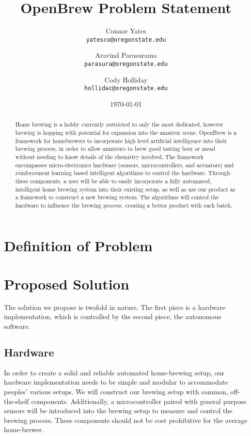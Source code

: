 \documentclass[letterpaper,10pt]{article}
\author{Connor Yates\\
\texttt{yatesco@oregonstate.edu}
\and
Aravind Parasurama\\
\texttt{parasura@oregonstate.edu}
\and
Cody Holliday\\
\texttt{hollidac@oregonstate.edu}}
\date{\today}
\title{OpenBrew Problem Statement}
\begin{document}
\maketitle

\begin{abstract}
Home brewing is a hobby currently restricted to only the most dedicated, however 
brewing is hopping with potential for expansion into the amateur scene. OpenBrew 
is a framework for homebrewers to incorporate high level artificial intelligence 
into their brewing process, in order to allow amateurs to brew good tasting beer 
or mead without needing to know details of the chemistry involved. The framework 
encompasses micro-electronics hardware (sensors, microcontrollers, and actuators) 
and reinforcement learning based intelligent algorithms to control the hardware. 
Through these components, a user will be able to easily incorporate a fully automated, 
intelligent home brewing system into their existing setup, as well as use our product 
as a framework to construct a new brewing system. The algorithms will control the 
hardware to influence the brewing process, creating a better product with each batch.
\end{abstract}

\newpage

\section{Definition of Problem}

\section{Proposed Solution}
The solution we propose is twofold in nature.
The first piece is a hardware implementation, which is controlled by the second piece, 
the autonomous software.

\subsection{Hardware}
In order to create a solid and reliable automated home-brewing setup, our hardware 
implementation needs to be simple and modular to accommodate peoples' various setups.
We will construct our brewing setup with common, off-the-shelf components.
Additionally, a microcontroller paired with general purpose sensors will be 
introduced into the brewing setup to measure and control the brewing process.
These components should not be cost prohibitive for the average home-brewer.
\end{document}
